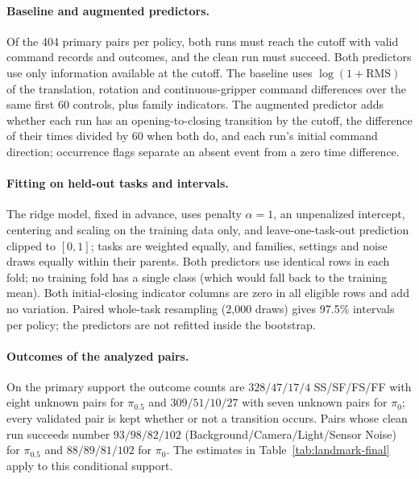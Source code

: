 \paragraph{Baseline and augmented predictors.}
Of the 404 primary pairs per policy, both runs must reach the cutoff with valid command records and outcomes, and the clean run must succeed. Both predictors use only information available at the cutoff. The baseline uses $\log(1+\mathrm{RMS})$ of the translation, rotation and continuous-gripper command differences over the same first 60 controls, plus family indicators. The augmented predictor adds whether each run has an opening-to-closing transition by the cutoff, the difference of their times divided by 60 when both do, and each run's initial command direction; occurrence flags separate an absent event from a zero time difference.

\paragraph{Fitting on held-out tasks and intervals.}
The ridge model, fixed in advance, uses penalty $\alpha=1$, an unpenalized intercept, centering and scaling on the training data only, and leave-one-task-out prediction clipped to $[0,1]$; tasks are weighted equally, and families, settings and noise draws equally within their parents. Both predictors use identical rows in each fold; no training fold has a single class (which would fall back to the training mean). Both initial-closing indicator columns are zero in all eligible rows and add no variation. Paired whole-task resampling (2,000 draws) gives 97.5\% intervals per policy; the predictors are not refitted inside the bootstrap.

\paragraph{Outcomes of the analyzed pairs.}
On the primary support the outcome counts are $328/47/17/4$ SS/SF/FS/FF with eight unknown pairs for $\pi_{0.5}$ and $309/51/10/27$ with seven unknown pairs for $\pi_0$; every validated pair is kept whether or not a transition occurs. Pairs whose clean run succeeds number $93/98/82/102$ (Background/Camera/Light/Sensor Noise) for $\pi_{0.5}$ and $88/89/81/102$ for $\pi_0$. The estimates in Table~\ref{tab:landmark-final} apply to this conditional support.
